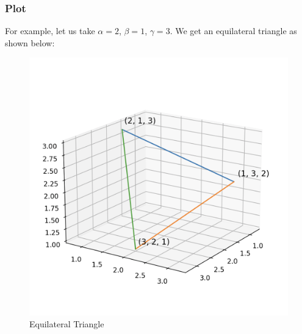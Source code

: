 \documentclass{beamer}
\begin{document}
\begin{frame}[fragile]
\frametitle{Plot}

For example, let us take $\alpha = 2$, $\beta = 1$, $\gamma = 3$.
We get an equilateral triangle as shown below:

\begin{figure}[H]
    \centering
    \includegraphics[width=0.6\columnwidth]{Figs/Example.png}
    \caption{Equilateral Triangle}
    \label{fig:placeholder}
\end{figure}

\end{frame}
\end{document}
